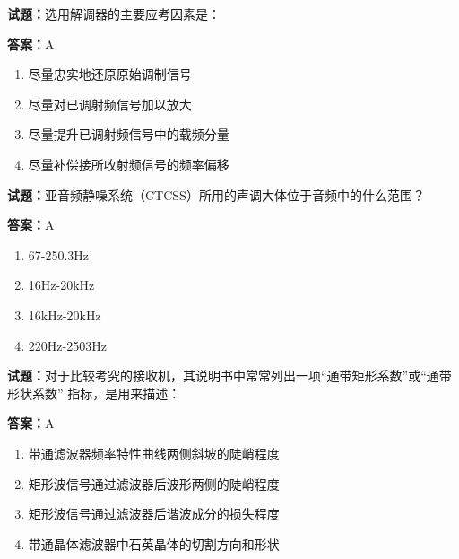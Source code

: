 \documentclass{ctexbook}
\begin{document}




\vspace{1em}

\textbf{试题：}选用解调器的主要应考因素是： 

\textbf{答案：}A 

\begin{enumerate}[leftmargin=3em]
  \item 尽量忠实地还原原始调制信号 

  \item 尽量对已调射频信号加以放大 

  \item 尽量提升已调射频信号中的载频分量 

  \item 尽量补偿接所收射频信号的频率偏移 

\end{enumerate}





\vspace{1em}

\textbf{试题：}亚音频静噪系统（CTCSS）所用的声调大体位于音频中的什么范围？ 

\textbf{答案：}A 

\begin{enumerate}[leftmargin=3em]
  \item 67-250.3Hz 

  \item 16Hz-20kHz 

  \item 16kHz-20kHz 

  \item 220Hz-2503Hz 


\end{enumerate}





\vspace{1em}

\textbf{试题：}对于比较考究的接收机，其说明书中常常列出一项“通带矩形系数”或“通带形状系数”
指标，是用来描述： 

\textbf{答案：}A 

\begin{enumerate}[leftmargin=3em]
  \item 带通滤波器频率特性曲线两侧斜坡的陡峭程度 

  \item 矩形波信号通过滤波器后波形两侧的陡峭程度 

  \item 矩形波信号通过滤波器后谐波成分的损失程度 

  \item 带通晶体滤波器中石英晶体的切割方向和形状 

\end{enumerate}
\end{document}
